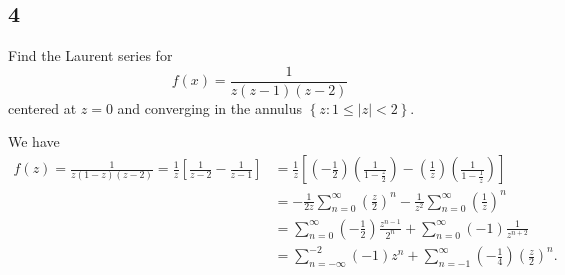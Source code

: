\documentclass[12pt]{article}
\begin{document}
\newpage
\subsection*{4}
\begin{tcolorbox}
Find the Laurent series for
\[ f(x) = \frac{1}{z(z-1)(z-2)} \]
centered at $z = 0$ and converging in the annulus $\left\{ z : 1 \leq |z| < 2 \right\}$.
\end{tcolorbox}
We have
\begin{align*}
f(z) = \frac{1}{z(1-z)(z-2)} = \frac{1}{z}\left[ \frac{1}{z - 2} - \frac{1}{z - 1} \right] & = \frac{1}{z}\left[
\left( -\frac{1}{2}\right)\left( \frac{1}{1 - \frac{z}{2}} \right)  - \left( \frac{1}{z} \right)\left( \frac{1}{1 - \frac{1}{z}} \right) \right] \\
& = -\frac{1}{2z}\sum_{n=0}^{\infty}\left( \frac{z}{2} \right)^{n} - \frac{1}{z^{2}}\sum_{n=0}^{\infty}\left( \frac{1}{z} \right)^{n} \\
& = \sum_{n=0}^{\infty}\left( -\frac{1}{2} \right)\frac{z^{n-1}}{2^{n}} + \sum_{n=0}^{\infty}(-1)\frac{1}{z^{n+2}} \\
& = \sum_{n=-\infty}^{-2}(-1)z^{n} + \sum_{n=-1}^{\infty}\left( -\frac{1}{4} \right)\left( \frac{z}{2} \right)^{n}.
\end{align*}

\newpage
\end{document}
